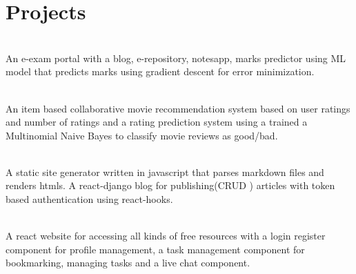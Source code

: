 \documentclass[]{deedy-resume-openfont}
\begin{document}
\section{Projects}
\raggedright

    \hfill {}\\
    An e-exam portal with a blog, e-repository, notesapp, marks predictor using ML model that predicts marks using gradient descent for error minimization.\\
    \sectionsep
  

    \hfill {}\\
    An item based collaborative movie recommendation system based on user ratings and number of ratings and a rating prediction system using a trained a Multinomial Naive Bayes to classify movie reviews as good/bad.\\
    \sectionsep
  

    \hfill {}\\
    A static site generator written in javascript that parses markdown files and renders htmls. A react-django blog for publishing(CRUD ) articles with token based authentication using react-hooks. \\
    \sectionsep
  

    \hfill {}\\
    A react website for accessing all kinds of free resources with a login register component for profile management, a task management component for bookmarking, managing tasks and a live chat component.\\
    \sectionsep
%
%
\end{document}
